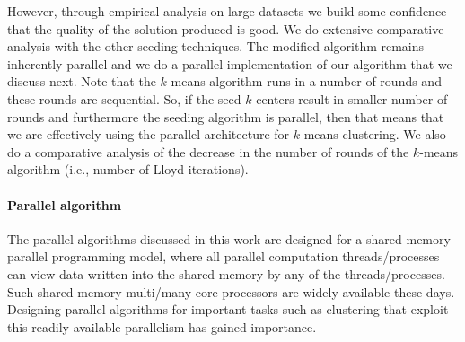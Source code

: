 However, through empirical analysis on large datasets we build some confidence that the quality of the solution produced is good.
We do extensive comparative analysis with the other seeding techniques.
The modified algorithm remains inherently parallel and we do a parallel implementation of our algorithm that we discuss next.
Note that the $k$-means algorithm runs in a number of rounds and these rounds are sequential.
So, if the seed $k$ centers result in smaller number of rounds and furthermore the seeding algorithm is parallel, then that means that we are effectively using the parallel architecture for $k$-means clustering. 
We also do a comparative analysis of the decrease in the number of rounds of the $k$-means algorithm (i.e., number of Lloyd iterations).

\paragraph{Parallel algorithm}
The parallel algorithms discussed in this work are designed for a shared memory parallel programming model, where all parallel computation threads/processes can view data written into the shared memory by any of the threads/processes.
Such shared-memory multi/many-core processors are widely available these days.
Designing parallel algorithms for important tasks such as clustering that exploit this readily available parallelism has gained importance.








